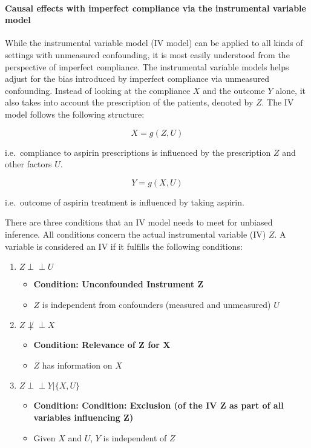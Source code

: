 \documentclass{article}
\newcommand{\ind}{\perp\!\!\!\!\perp}
\begin{document}
\hypertarget{causal-effects-with-imperfect-compliance-via-the-instrumental-variable-model}{%
\paragraph{Causal effects with imperfect compliance via the instrumental
variable
model}\label{causal-effects-with-imperfect-compliance-via-the-instrumental-variable-model}}

While the instrumental variable model (IV model) can be applied to all
kinds of settings with unmeasured confounding, it is most easily understood from the
perspective of imperfect compliance. The instrumental variable models helps adjust for the bias introduced by
imperfect compliance via unmeasured confounding. Instead of looking at
the compliance \(X\) and the outcome \(Y\) alone, it also takes into account
the prescription of the patients, denoted by \(Z\). The IV model follows the following structure:

$$X = g(Z, U)$$

i.e.~compliance to aspirin prescriptions is influenced
by the prescription \(Z\) and other factors \(U\).

$$Y = g(X, U)$$

i.e.~outcome of aspirin treatment is influenced by
taking aspirin.

There are three conditions that an IV model needs to meet for unbiased inference. All conditions concern the actual instrumental variable (IV) \(Z\). A variable is considered an IV if it fulfills the following conditions:

\begin{enumerate}
\def\labelenumi{\alph{enumi}.}
\tightlist
\item
  $Z \ind U$

  \begin{itemize}
  \tightlist
  \item
    \textbf{Condition: Unconfounded Instrument Z} 
  \item
    \(Z\) is independent from confounders (measured and unmeasured)
    \(U\)
  \end{itemize}
\item
  \(Z \not\ind X\)

  \begin{itemize}
  \tightlist
  \item
    \textbf{Condition: Relevance of Z for X} 
  \item
    \(Z\) has information on \(X\)
  \end{itemize}
\item
  $Z \ind Y | \{X,U\} $

  \begin{itemize}
  \tightlist
  \item
  \textbf{Condition: Condition: Exclusion (of the IV Z as part of all variables influencing Z)} 
  \item
    Given \(X\) and \(U\), \(Y\) is independent of \(Z\)
  \end{itemize}
\end{enumerate}
\end{document}
